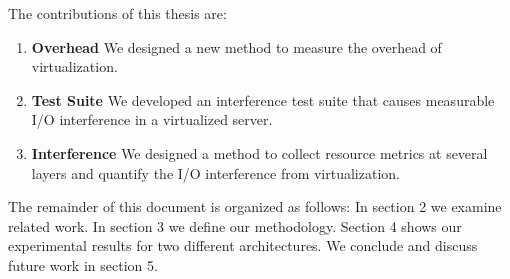 \noindent
The contributions of this thesis are:
\begin{enumerate}
\item \textbf{Overhead} We designed a new method to measure the overhead of virtualization.
\item \textbf{Test Suite} We developed an interference test suite that causes measurable I/O interference in a virtualized server.
\item \textbf{Interference} We designed a method to collect resource metrics at several layers and quantify the I/O interference from virtualization.
\end{enumerate}

The remainder of this document is organized as follows:  In section 2 we examine related work.  In section 3 we define our methodology.  Section 4 shows our experimental results for two different architectures.   We conclude and discuss future work in section 5.

